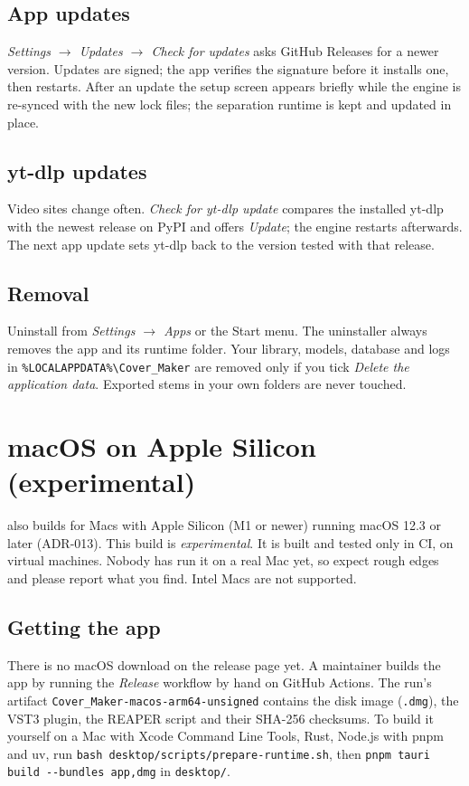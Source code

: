 \documentclass{covermaker}
\begin{document}
\section{App updates}
\emph{Settings $\rightarrow$ Updates $\rightarrow$ Check for updates} asks
GitHub Releases for a newer version. Updates are signed; the app verifies the
signature before it installs one, then restarts. After an update the setup
screen appears briefly while the engine is re-synced with the new lock files;
the separation runtime is kept and updated in place.

\section{yt-dlp updates}
Video sites change often. \emph{Check for yt-dlp update} compares the installed
yt-dlp with the newest release on PyPI and offers \emph{Update}; the engine
restarts afterwards. The next app update sets yt-dlp back to the version tested
with that release.

\section{Removal}
Uninstall from \emph{Settings $\rightarrow$ Apps} or the Start menu. The
uninstaller always removes the app and its runtime folder. Your library,
models, database and logs in
\texttt{\%LOCALAPPDATA\%\textbackslash Cover\_Maker} are removed only if you
tick \emph{Delete the application data}. Exported stems in your own folders are
never touched.

\chapter{macOS on Apple Silicon (experimental)}
\CM{} also builds for Macs with Apple Silicon (M1 or newer) running macOS
12.3 or later (ADR-013). This build is \emph{experimental}. It is built
and tested only in CI, on virtual machines. Nobody has run it on a real Mac
yet, so expect rough edges and please report what you find. Intel Macs are not
supported.

\section{Getting the app}
There is no macOS download on the release page yet. A maintainer builds the
app by running the \emph{Release} workflow by hand on GitHub Actions. The
run's artifact \texttt{Cover\_Maker-macos-arm64-unsigned} contains the disk
image (\texttt{.dmg}), the VST3 plugin, the REAPER script and their SHA-256
checksums. To build it yourself on a Mac with Xcode Command Line Tools, Rust,
Node.js with pnpm and uv, run
\texttt{bash desktop/scripts/prepare-runtime.sh}, then
\texttt{pnpm tauri build -{}-bundles app,dmg} in \texttt{desktop/}.
\end{document}
